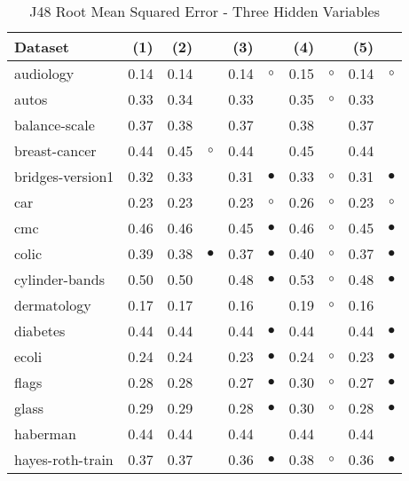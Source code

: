 \newpage
{\centering \footnotesize \begin{longtable}{lrr@{\hspace{0.1cm}}cr@{\hspace{0.1cm}}cr@{\hspace{0.1cm}}cr@{\hspace{0.1cm}}c}
\caption{\label{j48rmse3}J48 Root Mean Squared Error - Three Hidden Variables}
\\
\hline
Dataset & (1)& (2) & & (3) & & (4) & & (5) & \\
\hline
audiology & 0.14 & 0.14 &           & 0.14 &   $\circ$ & 0.15 &   $\circ$ & 0.14 &   $\circ$\\
autos & 0.33 & 0.34 &           & 0.33 &           & 0.35 &   $\circ$ & 0.33 &          \\
balance-scale & 0.37 & 0.38 &           & 0.37 &           & 0.38 &           & 0.37 &          \\
breast-cancer & 0.44 & 0.45 &   $\circ$ & 0.44 &           & 0.45 &           & 0.44 &          \\
bridges-version1 & 0.32 & 0.33 &           & 0.31 & $\bullet$ & 0.33 &   $\circ$ & 0.31 & $\bullet$\\
car & 0.23 & 0.23 &           & 0.23 &   $\circ$ & 0.26 &   $\circ$ & 0.23 &   $\circ$\\
cmc & 0.46 & 0.46 &           & 0.45 & $\bullet$ & 0.46 &   $\circ$ & 0.45 & $\bullet$\\
colic & 0.39 & 0.38 & $\bullet$ & 0.37 & $\bullet$ & 0.40 &   $\circ$ & 0.37 & $\bullet$\\
cylinder-bands & 0.50 & 0.50 &           & 0.48 & $\bullet$ & 0.53 &   $\circ$ & 0.48 & $\bullet$\\
dermatology & 0.17 & 0.17 &           & 0.16 &           & 0.19 &   $\circ$ & 0.16 &          \\
diabetes & 0.44 & 0.44 &           & 0.44 & $\bullet$ & 0.44 &           & 0.44 & $\bullet$\\
ecoli & 0.24 & 0.24 &           & 0.23 & $\bullet$ & 0.24 &   $\circ$ & 0.23 & $\bullet$\\
flags & 0.28 & 0.28 &           & 0.27 & $\bullet$ & 0.30 &   $\circ$ & 0.27 & $\bullet$\\
glass & 0.29 & 0.29 &           & 0.28 & $\bullet$ & 0.30 &   $\circ$ & 0.28 & $\bullet$\\
haberman & 0.44 & 0.44 &           & 0.44 &           & 0.44 &           & 0.44 &          \\
hayes-roth-train & 0.37 & 0.37 &           & 0.36 & $\bullet$ & 0.38 &   $\circ$ & 0.36 & $\bullet$\\

\end{longtable}}
